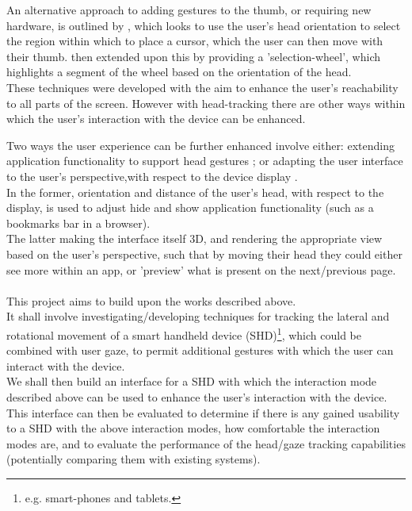 An alternative approach to adding gestures to the thumb, or requiring new hardware, is outlined by \cite{voelker2020headreach}, which looks to use the user's head orientation to select the region within which to place a cursor, which the user can then move with their thumb.
\cite{hueber2020headbang} then extended upon this by providing a 'selection-wheel', which highlights a segment of the wheel based on the orientation of the head.\\
These techniques were developed with the aim to enhance the user's reachability to all parts of the screen.
However with head-tracking there are other ways within which the user's interaction with the device can be enhanced.


Two ways the user experience can be further enhanced involve either: extending application functionality to support head gestures \citep{lopez2012head}; or adapting the user interface to the user's perspective,with respect to the device display \citep{francone2011using}.\\
In the former, orientation and distance of the user's head, with respect to the display, is used to adjust hide and show application functionality (such as a bookmarks bar in a browser).\\
The latter making the interface itself 3D, and rendering the appropriate view based on the user's perspective, such that by moving their head they could either see more within an app, or 'preview' what is present on the next/previous page.
\\\\
This project aims to build upon the works described above.\\
It shall involve investigating/developing techniques for tracking the lateral and rotational movement of a smart handheld device (SHD)\footnote{e.g. smart-phones and tablets.}, which could be combined with user gaze, to permit additional gestures with which the user can interact with the device.\\
We shall then build an interface for a SHD with which the interaction mode described above can be used to enhance the user's interaction with the device.\\
This interface can then be evaluated to determine if there is any gained usability to a SHD with the above interaction modes, how comfortable the interaction modes are, and to evaluate the performance of the head/gaze tracking capabilities (potentially comparing them with existing systems).